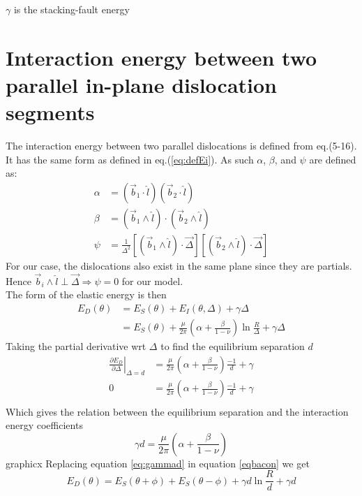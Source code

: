 \documentclass[10pt,a4paper,draft]{article}
\begin{document}
$\gamma$ is the stacking-fault energy

\section{Interaction energy between two parallel in-plane dislocation segments}
The interaction energy between two parallel dislocations is defined from eq.(5-16)\cite{hirth1982theory}. It has the same form as defined in eq.(\ref{eq:defEi}). As such $\alpha$, $\beta$, and $\psi$ are defined as:
\begin{subequations}
\begin{align}
\alpha &= \left(\vec{b}_1 \cdot \hat{l}\right)\left(\vec{b}_2 \cdot \hat{l}\right) \\
\beta &= \left(\vec{b}_1 \wedge \hat{l}\right) \cdot \left(\vec{b}_2 \wedge \hat{l}\right) \\
\psi &= \frac{1}{\Delta^2}\left[\left(\vec{b}_1 \wedge \hat{l}\right) \cdot \vec{\Delta}\right]
\left[\left(\vec{b}_2 \wedge \hat{l}\right) \cdot \vec{\Delta}\right]
\end{align}
\label{eq:alphabeta}
\end{subequations}
For our case, the dislocations also exist in the same plane since they are partials. Hence $\vec{b}_i \wedge \hat{l} \perp \vec{\Delta} \Rightarrow \psi = 0$ for our model. \\ 

The form of the elastic energy is then
\begin{subequations}
\begin{align*}
E_D(\theta) &= E_S(\theta) + E_I(\theta,\Delta) + \gamma\Delta \\
 &= E_S(\theta) + \frac{\mu}{2\pi}\left(\alpha+\frac{\beta}{1-\nu}\right)\ln\frac{R}{\Delta} + \gamma\Delta
\end{align*}
\end{subequations}
Taking the partial derivative wrt $\Delta$ to find the equilibrium separation $d$
\begin{subequations}
\begin{align*}
\left.\frac{\partial E_D}{\partial\Delta}\right|_{\Delta=d} &= \frac{\mu}{2\pi}\left(\alpha+\frac{\beta}{1-\nu}\right)\frac{-1}{d} + \gamma \\
0 &= \frac{\mu}{2\pi}\left(\alpha+\frac{\beta}{1-\nu}\right)\frac{-1}{d} + \gamma \\
\end{align*}
\end{subequations} 
Which gives the relation between the equilibrium separation and the interaction energy coefficients
\begin{equation}
\gamma d = \frac{\mu}{2\pi}\left(\alpha+\frac{\beta}{1-\nu}\right) \label{eq:gammad}
\end{equation}graphicx
Replacing equation \ref{eq:gammad} in equation \ref{eqbacon} we get
\begin{equation}
\boxed{
E_D(\theta) = E_S(\theta+\phi) + E_S(\theta-\phi) + \gamma d \ln\frac{R}{d} + \gamma d} \label{eq:finalED}
\end{equation}
\end{document}
